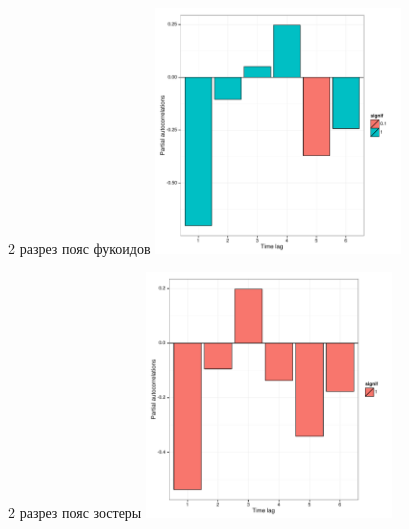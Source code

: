 \documentclass[12pt, a4paper]{disser}
\begin{document}
	\begin{figure}[ht]
	
	\begin{minipage}[b]{.46\linewidth}
	\begin{center}
	{\tiny 2 разрез пояс фукоидов}
		\includegraphics[width=65mm]{../White_Sea/oneyear_all_Kandalaksha_all/perm_PRCF_razrez2_fucus_zone_N1y.pdf}

	\end{center}
	\end{minipage}
	\hfil %
	\begin{minipage}[b]{.46\linewidth}
	\begin{center}
	{\tiny 2 разрез пояс зостеры}
		\includegraphics[width=65mm]{../White_Sea/oneyear_all_Kandalaksha_all/perm_PRCF_razrez2_zostera_zone_N1y.pdf}
	\end{center}
	\end{minipage}




\end{figure}
\end{document}

